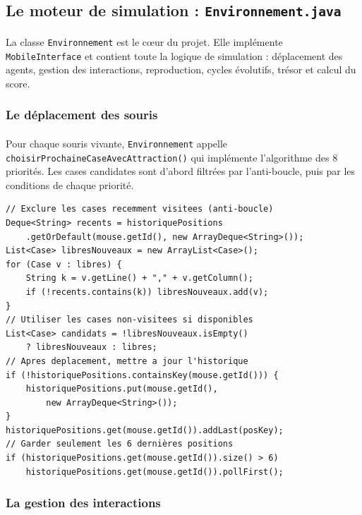 \subsection{Le moteur de simulation : \texttt{Environnement.java}}

\paragraph{} La classe \texttt{Environnement} est le cœur du projet. Elle implémente \texttt{MobileInterface} et contient toute la logique de simulation : déplacement des agents, gestion des interactions, reproduction, cycles évolutifs, trésor et calcul du score.

\subsubsection{Le déplacement des souris}

\paragraph{} Pour chaque souris vivante, \texttt{Environnement} appelle \texttt{choisirProchaineCaseAvecAttraction()} qui implémente l'algorithme des 8 priorités. Les cases candidates sont d'abord filtrées par l'anti-boucle, puis par les conditions de chaque priorité.

\begin{lstlisting}[caption={Mécanisme anti-boucle par historique de positions}]
// Exclure les cases recemment visitees (anti-boucle)
Deque<String> recents = historiquePositions
    .getOrDefault(mouse.getId(), new ArrayDeque<String>());
List<Case> libresNouveaux = new ArrayList<Case>();
for (Case v : libres) {
    String k = v.getLine() + "," + v.getColumn();
    if (!recents.contains(k)) libresNouveaux.add(v);
}
// Utiliser les cases non-visitees si disponibles
List<Case> candidats = !libresNouveaux.isEmpty()
    ? libresNouveaux : libres;
// Apres deplacement, mettre a jour l'historique
if (!historiquePositions.containsKey(mouse.getId())) {
    historiquePositions.put(mouse.getId(),
        new ArrayDeque<String>());
}
historiquePositions.get(mouse.getId()).addLast(posKey);
// Garder seulement les 6 dernières positions
if (historiquePositions.get(mouse.getId()).size() > 6)
    historiquePositions.get(mouse.getId()).pollFirst();
\end{lstlisting}

\subsubsection{La gestion des interactions}

